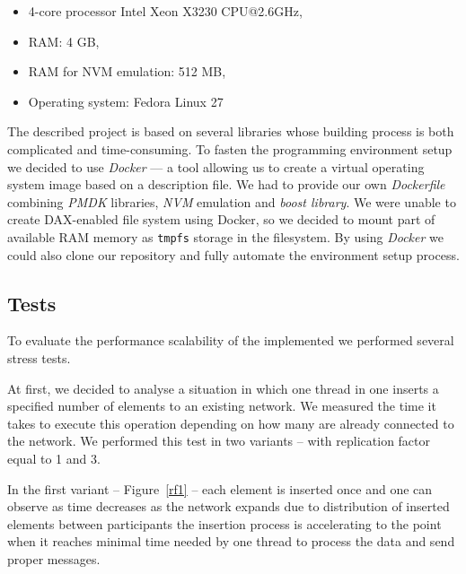         \begin{itemize}
            \item 4-core processor Intel Xeon X3230 CPU@2.6GHz,
            \item RAM: 4 GB,
            \item RAM for NVM emulation: 512 MB,
            \item Operating system: Fedora Linux 27
        \end{itemize}
        
        The described project is based on several libraries whose building process is both complicated and time-consuming.
        To fasten the programming environment setup we decided to use \textit{Docker} \cite{Docker} --- a tool allowing us to create a virtual operating system image based on a description file.
        We had to provide our own \textit{Dockerfile} combining \textit{PMDK} libraries, \textit{NVM} emulation and \textit{boost library}.
        We were unable to create DAX-enabled file system using Docker, so we decided to mount part of available RAM memory as \texttt{tmpfs} storage in the filesystem.
        By using \textit{Docker} we could also clone our repository and fully automate the environment setup process.
        
    \subsection{Tests}
    
        To evaluate the performance scalability of the implemented \DHTS we performed several stress tests.
        
        At first, we decided to analyse a situation in which one thread in one \Node inserts a specified number of elements to an existing network. 
        We measured the time it takes to execute this operation depending on how many \Nodes are already connected to the network.
        We performed this test in two variants -- with replication factor equal to 1 and 3.
        
        In the first variant -- Figure~\ref{rf1} -- each element is inserted once and one can observe as time decreases as the network expands 
        due to distribution of inserted elements between participants the insertion process is accelerating to the point when it reaches minimal time needed by one thread to process the data and send proper messages.
        
